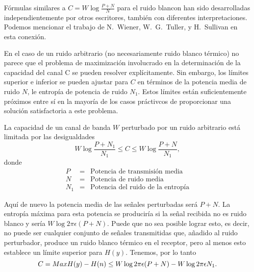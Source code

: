 F\'ormulas similares a $C = W\log \frac{P+N}{N}$ para el ruido blancon
han sido desarrolladas independientemente por otros escritores,
tambi\'en con diferentes interpretaciones. Podemos mencionar el
trabajo de N.\ Wiener, W.\ G.\ Tuller, y H.\ Sullivan en esta
conexi\'on.

En el caso de un ruido arbitrario (no necesariamente ruido blanco
t\'ermico) no parece que el problema de maximizaci\'on involucrado en
la determinaci\'on de la capacidad del canal C se pueden resolver
expl\'icitamente. Sin embargo, los l\'imites superior e inferior se
pueden ajustar para $C$ en t\'erminos de la potencia media de ruido
$N$, le entrop\'ia de potencia de ruido $N_{1}$.  Estos l\'imites
est\'an suficientemente pr\'oximos entre s\'i en la mayor\'ia de los
casos pr\'activcos de proporcionar una soluci\'on satisfactoria a este
problema.

\begin{theorem}
\label{t18}
La capacidad de un canal de banda $W$ perturbado por un ruido
arbitrario est\'a limitada por las desigualdades
\begin{equation}
W\log \frac{P+N_{1}}{N_{1}} \leq C \leq W\log \frac{P+N}{N_{1}},
\end{equation}
donde 
\begin{equation}
\begin{array}{rcl}
P &=& \text{Potencia de transmisi\'on media} \\
N &=& \text{Potencia de ruido media} \\
N_{1} &=& \text{Potencia del ruido de la entrop\'ia}
\end{array}
\end{equation}
\end{theorem}	

Aqu\'i de nuevo la potencia media de las se\~nales perturbadas ser\'a
$P+N$. La entrop\'ia m\'axima para esta potencia se producir\'ia si la
se\~nal recibida no es ruido blanco y ser\'ia $W\log 2\pi \epsilon
(P+N)$.  Puede que no sea posible lograr esto, es decir, no puede ser
cualquier conjunto de se\~nales transmitidas que, a\~nadido al ruido
perturbador, produce un ruido blanco t\'ermico en el receptor, pero al
menos esto establece un l\'imite superior para $H(y)$.  Tenemos, por
lo tanto
\begin{equation}
C = Max H(y) - H(n)\bigskip
\leq W\log 2\pi\epsilon (P+N) - W\log 2\pi \epsilon N_{1}.
\end{equation}
	
